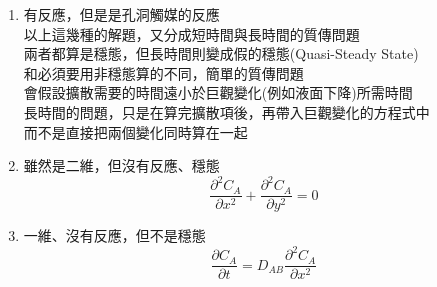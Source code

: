 \documentclass[../main.tex]{subfiles}
\begin{document}
\begin{itemize}
\begin{itemize}
\begin{enumerate}
    \item 有反應，但是是孔洞觸媒的反應\\
    以上這幾種的解題，又分成短時間與長時間的質傳問題\\
    兩者都算是穩態，但長時間則變成假的穩態(Quasi-Steady State)\\
    和必須要用非穩態算的不同，簡單的質傳問題\\
    會假設擴散需要的時間遠小於巨觀變化(例如液面下降)所需時間\\
    長時間的問題，只是在算完擴散項後，再帶入巨觀變化的方程式中\\
    而不是直接把兩個變化同時算在一起
    \item 雖然是二維，但沒有反應、穩態
    \begin{equation}
      \frac{\partial^2 C_A}{\partial x^2} + \frac{\partial^2 C_A}{\partial y^2} = 0
    \end{equation}
    \item 一維、沒有反應，但不是穩態
    \begin{equation}
      \frac{\partial C_A}{\partial t} = D_{AB} \frac{\partial^2 C_A}{\partial x^2}
    \end{equation}
  \end{enumerate}
\end{itemize}
\end{itemize}
\end{document}
